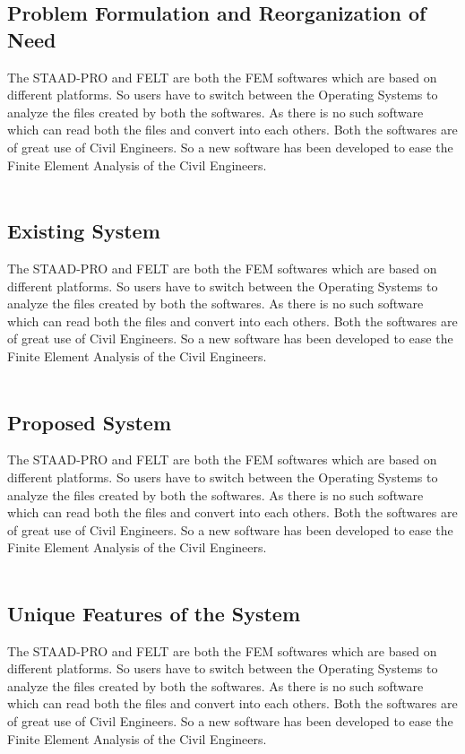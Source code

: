 \subsection{Problem Formulation and Reorganization of Need}
The STAAD-PRO and FELT are both the FEM softwares which are based on
different platforms. So users have to switch between the Operating
Systems to analyze the files created by both the softwares. As there
is no such software which can read both the files and convert into
each others. Both the softwares are of great use of Civil Engineers.
So a new software has been developed to ease the Finite Element
Analysis of the Civil Engineers.\\\\


\subsection{Existing System}
The STAAD-PRO and FELT are both the FEM softwares which are based on
different platforms. So users have to switch between the Operating
Systems to analyze the files created by both the softwares. As there
is no such software which can read both the files and convert into
each others. Both the softwares are of great use of Civil Engineers.
So a new software has been developed to ease the Finite Element
Analysis of the Civil Engineers.\\\\

\subsection{Proposed System}
The STAAD-PRO and FELT are both the FEM softwares which are based on
different platforms. So users have to switch between the Operating
Systems to analyze the files created by both the softwares. As there
is no such software which can read both the files and convert into
each others. Both the softwares are of great use of Civil Engineers.
So a new software has been developed to ease the Finite Element
Analysis of the Civil Engineers.\\\\


\subsection{Unique Features of the System}
The STAAD-PRO and FELT are both the FEM softwares which are based on
different platforms. So users have to switch between the Operating
Systems to analyze the files created by both the softwares. As there
is no such software which can read both the files and convert into
each others. Both the softwares are of great use of Civil Engineers.
So a new software has been developed to ease the Finite Element
Analysis of the Civil Engineers.\\\\
